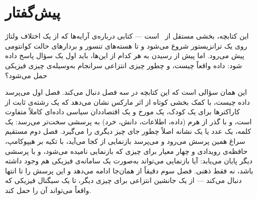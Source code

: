 \chapter*{پیش‌گفتار}

این کتابچه، بخشی مستقل از \BookletSubtitle\ است --- کتابی درباره‌ی
آرایه‌ها که از یک اختلاف ولتاژ روی یک ترانزیستور شروع می‌شود و تا
هسته‌های تنسور و بردارهای حالت کوانتومی پیش می‌رود. اما پیش از رسیدن
به هر کدام از این‌ها، باید اول یک سؤال پاسخ داده شود: داده واقعاً
چیست، و چطور چیزی انتزاعی سرانجام به‌وسیله‌ی چیزی فیزیکی حمل می‌شود؟

این همان سؤالی است که این کتابچه در سه فصل دنبال می‌کند. فصل اول
می‌پرسد داده چیست، با کمک بخشی کوتاه از 
اثر مارکس نشان می‌دهد که یک رشته‌ی ثابت از کاراکترها برای یک کودک،
یک مورخ و یک اقتصاددان سیاسی داده‌ای کاملاً متفاوت است، و با گذر از
هرم  (داده، اطلاعات، دانش، خرد) به پرسشی سخت‌تر می‌رسد: یک
کلمه، یک عدد یا یک نشانه اصلاً چطور جای چیز دیگری را می‌گیرد. فصل دوم
مستقیم سراغ همین پرسش می‌رود و می‌پرسد بازنمایی از کجا می‌آید، با
تکیه بر هیپوکامپ، حافظه‌ی رویدادی و چهار معیار برای چیزی که بازنمایی
نامیده می‌شود، و با پرسشی دیگر پایان می‌یابد: آیا بازنمایی می‌تواند
به‌صورت یک سامانه‌ی فیزیکی هم وجود داشته باشد، نه فقط ذهنی. فصل سوم
دقیقاً از همان‌جا ادامه می‌دهد و این پرسش را تا انتها دنبال می‌کند ---
از یک جانشین انتزاعی برای چیزی دیگر، تا یک سیگنال فیزیکی که واقعاً
می‌تواند آن را حمل کند.

\vfill

\begin{flushleft}
\textit{\BookletAuthor} \\
\textit{\BookletYear}
\end{flushleft}
